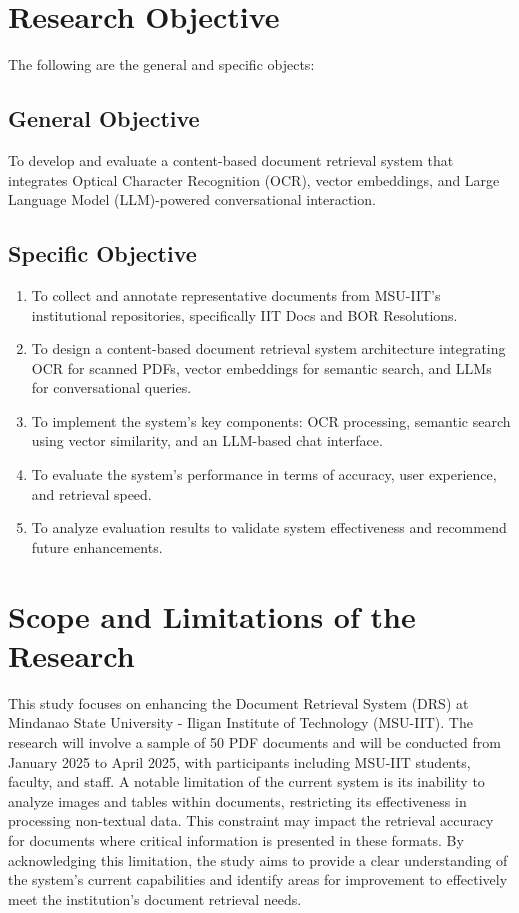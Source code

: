 \section{Research Objective}

The following are the general and specific objects:

\subsection{General Objective}

To develop and evaluate a content-based document retrieval system that integrates Optical Character Recognition (OCR), vector embeddings, and Large Language Model (LLM)-powered conversational interaction.

\subsection{Specific Objective}\label{sec:objectives}

\begin{enumerate}
  \item To collect and annotate representative documents from MSU-IIT’s institutional repositories, specifically IIT Docs and BOR Resolutions.
  \item To design a content-based document retrieval system architecture integrating OCR for scanned PDFs, vector embeddings for semantic search, and LLMs for conversational queries.
  \item To implement the system’s key components: OCR processing, semantic search using vector similarity, and an LLM-based chat interface.
  \item To evaluate the system’s performance in terms of accuracy, user experience, and retrieval speed.
  \item To analyze evaluation results to validate system effectiveness and recommend future enhancements.
\end{enumerate}

\section{Scope and Limitations of the Research}\label{sec:scope}

This study focuses on enhancing the Document Retrieval System (DRS) at Mindanao State University - Iligan Institute of Technology (MSU-IIT). The research will involve a sample of 50 PDF documents and will be conducted from January 2025 to April 2025, with participants including MSU-IIT students, faculty, and staff. A notable limitation of the current system is its inability to analyze images and tables within documents, restricting its effectiveness in processing non-textual data. This constraint may impact the retrieval accuracy for documents where critical information is presented in these formats. By acknowledging this limitation, the study aims to provide a clear understanding of the system's current capabilities and identify areas for improvement to effectively meet the institution's document retrieval needs.


